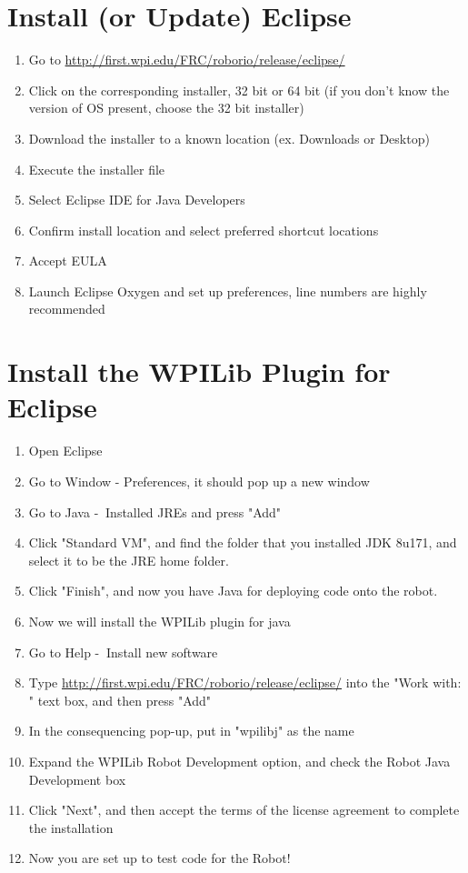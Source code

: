 \documentclass[11pt,fleqn]{article}
\begin{document}
\section*{Install (or Update) Eclipse}
\begin{enumerate}
\item Go to \href{https://eclipse.org/downloads/eclipse-packages/}{http://first.wpi.edu/FRC/roborio/release/eclipse/}
\item Click on the corresponding installer, 32 bit or 64 bit (if you don't know the version of OS present, choose the 32 bit installer)
\item Download the installer to a known location (ex. Downloads or Desktop)
\item Execute the installer file
\item Select Eclipse IDE for Java Developers
\item Confirm install location and select preferred shortcut locations
\item Accept EULA
\item Launch Eclipse Oxygen and set up preferences, line numbers are highly recommended
\end{enumerate}

\section*{Install the WPILib Plugin for Eclipse}
\begin{enumerate}
\item Open Eclipse
\item Go to Window - Preferences, it should pop up a new window
\item Go to Java -$\>$ Installed JREs and press "Add"
\item Click "Standard VM", and find the folder that you installed JDK 8u171, and select it to be the JRE home folder.
\item Click "Finish", and now you have Java for deploying code onto the robot.
\item Now we will install the WPILib plugin for java
\item Go to Help -$\>$ Install new software
\item Type \href{http://first.wpi.edu/FRC/roborio/release/eclipse/}{http://first.wpi.edu/FRC/roborio/release/eclipse/} into the "Work with: " text box, and then press "Add"
\item In the consequencing pop-up, put in "wpilibj" as the name
\item Expand the WPILib Robot Development option, and check the Robot Java Development box
\item Click "Next", and then accept the terms of the license agreement to complete the installation
\item Now you are set up to test code for the Robot!
\end{enumerate}
\end{document}
